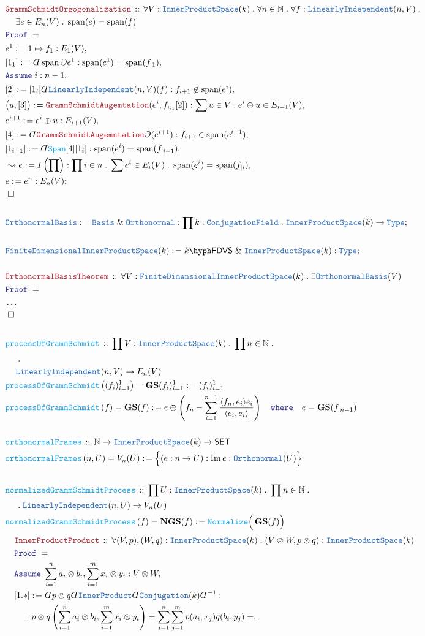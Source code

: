 \documentclass[12pt]{scrartcl}%
\newcommand{\TYPE}[1]{\textcolor{NavyBlue}{\mathtt{#1}}}%
\newcommand{\FUNC}[1]{\textcolor{Cerulean}{\mathtt{#1}}}%
\newcommand{\LOGIC}[1]{\textcolor{Blue}{\mathtt{#1}}}%
\newcommand{\THM}[1]{\textcolor{Maroon}{\mathtt{#1}}}%
\renewcommand{\.}{\; . \;} %
\newcommand{\de}{: \kern 0.1pc =} %
\newcommand{\where}{\LOGIC{where}} %
\newcommand{\Act}[1]{\left( #1 \right)} %
\newcommand{\Theorem}[2]{& \THM{#1} \, :: \, #2 \\ & \Proof = \\ } %
\newcommand{\DeclareFunc}[2]{& \FUNC{#1} \, :: \, #2 \\}%
\newcommand{\DefineNamedFunc}[4]{&  \FUNC{#1}\Act{#2} = #3 \de #4 \\}%
\newcommand{\NewLine}{\\ & \kern 1pc}%
\newcommand{\Page}[1]{ \begin{align*} #1 \end{align*}  }%
\newcommand{ \bd }{ \ByDef }%
\newcommand{\NoProof}{ & \ldots \\ \EndProof}%
\renewcommand{\And}{\; \& \;}%
\newcommand{\Type}{\TYPE{Type}}%
\newcommand{\Nat}{\mathbb{N}}%
\DeclareMathOperator*{\im}{Im}%
\newcommand{\Say}[3]{& #1 \de #2 : #3, \\} %
\newcommand{\Conclude}[3]{& #1 \de #2 : #3; \\}%
\newcommand{\Derive}[3]{& \leadsto #1 \de #2 : #3, \\} %
\newcommand{\Assume}[2]{& \LOGIC{Assume} \; #1 : #2, \\} %
\newcommand{\QED}{\; \square} %
\newcommand{\EndProof}{& \QED \\} %
\newcommand{\ByDef}{\rotatebox[origin=c]{-180}{$D$}}%
\newcommand{\ByConstr}{\rotatebox[origin=c]{-180}{$C$}}%
\newcommand{\Proof}{\LOGIC{Proof} \; } %
\newcommand{\SET}{\mathsf{SET}} %
\newcommand{\Basis}{\TYPE{Basis}} %
\newcommand{\LI}{\TYPE{LinearlyIndependent}}
\newcommand{\IPS}{\TYPE{InnerProductSpace}}
\newcommand{\OBasis}{\TYPE{OrthonormalBasis}}
\newcommand{\FDIPS}{\TYPE{FiniteDimensionalInnerProductSpace}}
\DeclareMathOperator{\Span}{span} %
\DeclareMathOperator{\GS}{\mathbf{GS}} %
\DeclareMathOperator{\NGS}{\mathbf{NGS}} %
\newcommand{\FDVS}[1]{#1\hyph\mathsf{FDVS}} %
\begin{document}
\Page{
	\Theorem{GrammSchmidtOrgogonalization}{
		\forall V : \IPS(k) \.
		\forall n \in \Nat \.
		\forall f : \LI(n,V) \. \NewLine
		\exists e \in E_n(V) \.
		\Span(e) = \Span(f) 
	}
	\Say{e^1}{1 \mapsto f_1}{E_1(V)}
	\Say{[1_1]}{\bd \Span \ByConstr e^1}{\Span(e^1) = \Span(f_{|1})}
	\Assume{i}{n-1}
	\Say{[2]}{[1_i]\bd \LI(n,V)(f)}{ f_{i+1} \not \in \Span(e^i)}
	\Say{\big(u,[3]\big)}{\THM{GrammSchmidtAugemtation}(e^i,f_{i,_1}[2])}{ 
		\sum u \in V \. e^i \oplus u \in E_{i+1}(V) 
	}
	\Say{e^{i+1}}{e^i \oplus u}{E_{i+1}(V)}
	\Say{[4]}{\bd \THM{GrammSchmidtAugemntation}\ByConstr(e^{i+1})}{f_{i+1} \in \Span(e^{i+1})}
	\Conclude{[1_{i+1}]}{\bd \FUNC{Span}[4][1_i]}{ \Span(e^i) = \Span(f_{|i+1}) }
	\Derive{e}{I\Act{\prod}}{\prod i \in n \. \sum e^i \in E_i(V) \. \Span(e^i) = \Span(f_{|i}) }
	\Conclude{e}{e^n}{E_n(V)}
	\EndProof
	\\
	\Conclude{\OBasis}{ \Basis \And \TYPE{Orthonormal} }{\prod k : \TYPE{ConjugationField} \. \IPS(k) \to \Type}
	\\
	\Conclude{\FDIPS(k)}{\FDVS{k} \And \IPS(k)}{\Type}
	\\
	\Theorem{OrthonormalBasisTheorem}{\forall V : \FDIPS(k) \. \exists \OBasis(V)} 
	\NoProof
	\\
	\DeclareFunc{processOfGrammSchmidt}{\prod V : \IPS(k) \. \prod n \in \Nat \.  \NewLine \. \NewLine \LI(n,V) \to E_n(V)}
	\DefineNamedFunc{processOfGrammSchmidt}{(f_i)^1_{i=1}}{\GS(f_i)^1_{i=1}}{(f_i)^1_{i=1}}
	\DefineNamedFunc{processOfGrammSchmidt}{f}{\GS(f)}{ 
		e \oplus \left(f_n - \sum^{n-1}_{i=1} \frac{\langle f_n, e_i  \rangle e_i}{\langle e_i, e_i \rangle}  \right)
		\quad \where \quad e = \GS(f_{|n-1}) 
	}
	\\
	\DeclareFunc{orthonormalFrames}{ \Nat \to \IPS(k) \to \SET  }
	\DefineNamedFunc{orthonormalFrames}{n, U}{V_n(U)}{ \Big\{ (e : n \to U) : \im e : \TYPE{Orthonormal}(U)\Big\}}
	\\
	\DeclareFunc{normalizedGrammSchmidtProcess}{\prod U : \IPS(k) \. \prod n \in \Nat \. \NewLine \. \LI(n,U) \to V_n(U)}
	\DefineNamedFunc{normalizedGrammSchmidtProcess}{f}{\NGS(f)}{\FUNC{Normalize}\Big( \GS(f) \Big)}
}\Page{
	\Theorem{InnerProductProduct}{\forall (V,p),(W,q) : \IPS(k) \. (V \otimes W, p \otimes q) : \IPS(k)}
	\Assume{\sum^n_{i=1} a_i \otimes b_i,\sum^m_{i=1} x_i \otimes y_i}{V \otimes W}
	\Say{[1.*]}{ \bd p \otimes q \bd \TYPE{InnerProduct} \bd \TYPE{Conjugation}(k) \bd^{-1} }
	{  
		\NewLine :
		p \otimes q\left( \sum^n_{i=1} a_i \otimes b_i , \sum^m_{i=1} x_i \otimes y_i \right)  =
		\sum^n_{i=1} \sum^m_{j=1} p(a_i,x_j)q(b_i,y_j) =
}}
\end{document}
